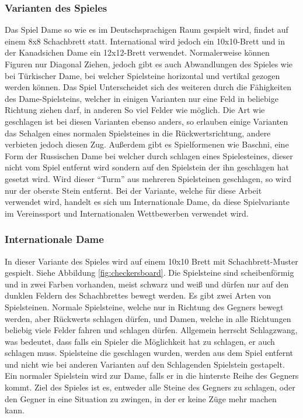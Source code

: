 \documentclass[12pt,a4paper,bibliography=totocnumbered,listof=totocnumbered]{article}
\begin{document}
\subsubsection{Varianten des Spieles}
Das Spiel Dame so wie es im Deutschsprachigen Raum gespielt wird, findet auf einem 8x8 Schachbrett statt. 
International wird jedoch ein 10x10-Brett und in der Kanadsichen Dame ein 12x12-Brett verwendet. 
Normalerweise können Figuren nur Diagonal Ziehen, jedoch gibt es 
auch Abwandlungen des Spieles wie bei Türkischer Dame, bei welcher Spielsteine horizontal und vertikal gezogen werden können.
Das Spiel Unterscheidet sich des weiteren durch die Fähigkeiten
des Dame-Spielsteins, welcher in einigen Varianten nur eine Feld in beliebige Richtung ziehen darf, in anderen 
So viel Felder wie möglich. Die Art wie geschlagen ist bei diesen Varianten ebenso anders, so erlauben
einige Varianten das Schalgen eines normalen Spielsteines in die Rückwertsrichtung, andere verbieten 
jedoch diesen Zug. Außerdem gibt es Spielformenen wie Baschni, eine Form der Russischen Dame bei welcher durch schlagen 
eines Spielesteines, dieser nicht vom Spiel entfernt wird sondern auf den Spielstein der ihn geschlagen hat gesetzt wird. 
Wird dieser ``Turm'' aus mehreren Spielsteinen geschlagen, so wird nur der oberste Stein entfernt. 
Bei der Variante, welche für diese Arbeit verwendet wird, handelt es sich um Internationale Dame, da diese 
Spielvariante im Vereinssport und Internationalen Wettbewerben verwendet wird. \cite{DraughtsHistory}

\subsubsection{Internationale Dame}
In dieser Variante des Spieles wird auf einem 10x10 Brett mit Schachbrett-Muster gespielt.
Siehe Abbildung \ref{fig:checkersboard}. Die Spielsteine
sind scheibenförmig und in zwei Farben vorhanden, meist schwarz und weiß und dürfen nur auf den dunklen
Feldern des Schachbrettes bewegt werden. Es gibt zwei Arten von Spielsteinen. Normale Spielsteine, welche
nur in Richtung des Gegners bewegt werden, aber Rückwerts schlagen dürfen, und Damen, welche
in alle Richtungen beliebig viele Felder fahren und schlagen dürfen. Allgemein herrscht Schlagzwang,
was bedeutet, dass falls ein Spieler die Möglichkeit hat zu schlagen, er auch schlagen muss.
Spielsteine die geschlagen wurden, werden aus dem Spiel entfernt und nicht wie bei anderen Varianten 
auf den Schlagenden Spielstein gestapelt.
Ein normaler Spielstein wird zur Dame, falls er in die hinterste Reihe des Gegners kommt.
Ziel des Spieles ist es, entweder alle Steine des Gegners zu schlagen, oder den Gegner in eine Situation
zu zwingen, in der er keine Züge mehr machen kann. \cite{InternationalCheckersRules}
\end{document}

